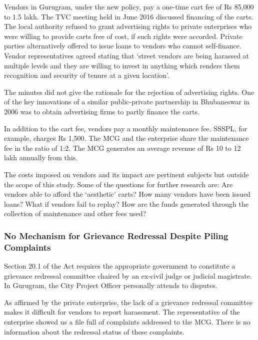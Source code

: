 \documentclass[a4paper, 12pt, twoside, table]{article}
\begin{document}
{{Vendors in Gurugram, under the new policy, pay a one-time cart fee of Rs 85,000 to 1.5 lakh. The TVC meeting held in June 2016 discussed financing of the carts. The local authority refused to grant advertising rights to private enterprises who were willing to provide carts free of cost, if such rights were accorded. Private parties alternatively offered to issue loans to vendors who cannot self-finance. Vendor representatives agreed stating that `street vendors are being harassed at multiple levels and they are willing to invest in anything which renders them recognition and security of tenure at a given location'.

The minutes did not give the rationale for the rejection of advertising rights. One of the key innovations of a similar public-private partnership in Bhubaneswar in 2006 was to obtain advertising firms to partly finance the carts.

In addition to the cart fee, vendors pay a monthly maintenance fee. SSSPL, for example, charges Rs 1,500. The MCG and the enterprise share the maintenance fee in the ratio of 1:2. The MCG generates an average revenue of Rs 10 to 12 lakh annually from this.

The costs imposed on vendors and its impact are pertinent subjects but outside the scope of this study. Some of the questions for further research are: Are vendors able to afford the `aesthetic' carts? How many vendors have been issued loans? What if vendors fail to replay? How are the funds generated through the collection of maintenance and other fees used?

\subsubsection*{No Mechanism for Grievance Redressal Despite Piling Complaints}

Section 20.1 of the Act requires the appropriate government to constitute a grievance redressal committee chaired by an ex-civil judge or judicial magistrate. In Gurugram, the City Project Officer personally attends to disputes.

As affirmed by the private enterprise, the lack of a grievance redressal committee makes it difficult for vendors to report harassment. The representative of the enterprise showed us a file full of complaints addressed to the MCG. There is no information about the redressal status of these complaints.

}}
\end{document}
